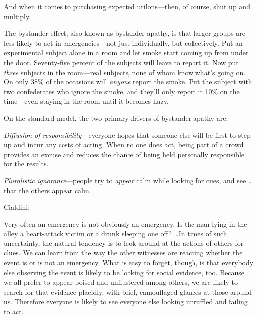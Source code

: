 {
 And when it comes to purchasing expected utilons---then, of
course, shut up and multiply.}

\myendsectiontext


{
 The bystander effect, also known as bystander apathy, is that
larger groups are less likely to act in emergencies---not just
individually, but collectively. Put an experimental subject alone in a
room and let smoke start coming up from under the door. Seventy-five
percent of the subjects will leave to report it. Now put \textit{three}
subjects in the room---real subjects, none of whom know
what's going on. On only 38\% of the occasions will
\textit{anyone} report the smoke. Put the subject with two confederates
who ignore the smoke, and they'll only report it 10\%
on the time---even staying in the room until it becomes
hazy. }

{
 On the standard model, the two primary drivers of bystander apathy
are:}

{
 \textit{Diffusion of responsibility}{}---everyone hopes that
someone else will be first to step up and incur any costs of acting.
When no one does act, being part of a crowd provides an excuse and
reduces the chance of being held personally responsible for the
results.}

{
 \textit{Pluralistic ignorance}{}---people try to \textit{appear}
calm while looking for cues, and see \ldots that the others appear
calm.}

{
 Cialdini:}

{
 Very often an emergency is not obviously an emergency. Is the man
lying in the alley a heart-attack victim or a drunk sleeping one off?
\ldots In times of such uncertainty, the natural tendency is to look
around at the actions of others for clues. We can learn from the way
the other witnesses are reacting whether the event is or is not an
emergency. What is easy to forget, though, is that everybody else
observing the event is likely to be looking for social evidence, too.
Because we all prefer to appear poised and unflustered among others, we
are likely to search for that evidence placidly, with brief,
camouflaged glances at those around us. Therefore everyone is likely to
see everyone else looking unruffled and failing to act.}

